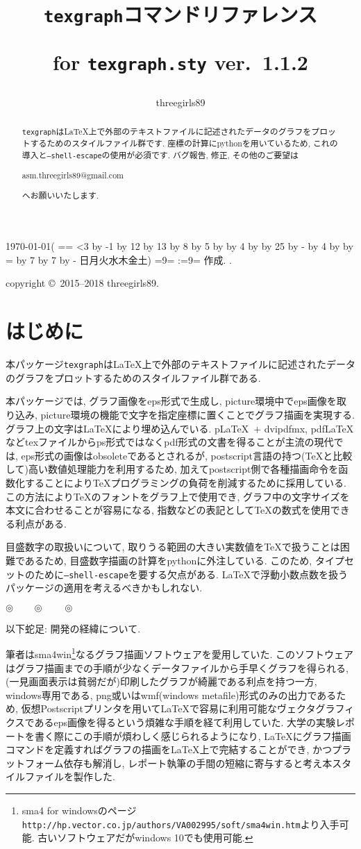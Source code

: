 \documentclass[10pt,a4j,twoside]{jsarticle}
\makeatletter
\def\Section#1{%
\clearpage
\section{#1}
\markboth{\thesection\hspace{1zw}#1}{\texttt{texgraph}コマンドリファレンス}%
}
\def\dayofweek{%
{\count0=\year \count1=\month
\ifnum \count1<3
 \advance \count0 by -1
 \advance \count1 by 12
\fi
\multiply \count1 by 13
\advance \count1 by 8
\divide \count1 by 5
\advance \count1 by \count0
\divide \count0 by 4
\advance \count1 by \count0
\divide \count0 by 25
\advance \count1 by -\count0
\divide \count0 by 4
\advance \count1 by \count0
\advance \count1 by \day
\count0=\count1
\divide \count1 by 7
\multiply \count1 by 7
\advance \count0 by -\count1
\ifcase \count0 日\or 月\or 火\or 水\or 木\or 金\or 土\fi}}
\def\ddigit#1{\setbox0=\hbox{9}\setbox1=\hbox{#1}%
  \ifdim \wd0<\wd1 #1\else 0#1\fi}
\newcounter{hour}
\newcounter{minuite}
\def\digitalhour{\ddigit{\thehour}}
\def\digitalminuite{\ddigit{\theminuite}}%
\renewcommand{\maketitle}{%
\begin{center}
{\gtfamily\bfseries\huge \@title}
\par
\bigskip
\ifx\@date\empty
\today (\dayofweek)
\digitalhour:\digitalminuite
\else
\@date
\fi
作成.
\hfil \@author.
\end{center}%
\global\let\@date\empty
\global\let\date\relax%
}
\def\date#1{\gdef\@date{#1}}
\def\circlesep{%
\begin{center}$\circledcirc\qquad\circledcirc\qquad\circledcirc$\end{center}%
}
\makeatother
\begin{document}
\thispagestyle{empty}
\title{\texttt{texgraph}コマンドリファレンス\\ \strut {\mdseries\large for \texttt{texgraph.sty} ver.\ 1.1.2}}
\author{threegirls89}
\maketitle
%
\begin{abstract}
\texttt{texgraph}は\LaTeX{}上で外部のテキストファイルに記述されたデータのグラフをプロットするためのスタイルファイル群です.
座標の計算にpythonを用いているため, これの導入と\texttt{--shell-escape}の使用が必須です.
バグ報告, 修正, その他のご要望は
\begin{center}
asm.threegirls89@gmail.com
\end{center}
へお願いいたします.%
\end{abstract}
%
\tableofcontents
%
\vfill
\begin{flushright}
copyright \copyright\ 2015--2018 threegirls89.
\end{flushright}

\Section{はじめに}
本パッケージ\texttt{texgraph}は\LaTeX{}上で外部のテキストファイルに記述されたデータのグラフをプロットするためのスタイルファイル群である.

本パッケージでは, グラフ画像をeps形式で生成し, picture環境中でeps画像を取り込み, picture環境の機能で文字を指定座標に置くことでグラフ描画を実現する.
グラフ上の文字は\LaTeX{}により埋め込んでいる.
p\LaTeX\ $+$ dvipdfmx, pdf\LaTeX{}などtexファイルからps形式ではなくpdf形式の文書を得ることが主流の現代では, eps形式の画像はobsoleteであるとされるが, postscript言語の持つ(\TeX{}と比較して)高い数値処理能力を利用するため, 加えてpostscript側で各種描画命令を函数化することにより\TeX{}プログラミングの負荷を削減するために採用している.
この方法により\TeX{}のフォントをグラフ上で使用でき, グラフ中の文字サイズを本文に合わせることが容易になる, 指数などの表記として\TeX{}の数式を使用できる利点がある.

目盛数字の取扱いについて, 取りうる範囲の大きい実数値を\TeX{}で扱うことは困難であるため, 目盛数字描画の計算をpythonに外注している.
このため, タイプセットのために\texttt{--shell-escape}を要する欠点がある.
\LaTeX{}で浮動小数点数を扱うパッケージの適用を考えるべきかもしれない.

\circlesep

以下蛇足: 開発の経緯について.

筆者はsma4win\footnote{sma4 for windowsのページ\texttt{http://hp.vector.co.jp/authors/VA002995/soft/sma4win.htm}より入手可能. 古いソフトウェアだがwindows 10でも使用可能.}なるグラフ描画ソフトウェアを愛用していた.
このソフトウェアはグラフ描画までの手順が少なくデータファイルから手早くグラフを得られる, (一見画面表示は貧弱だが)印刷したグラフが綺麗である利点を持つ一方, 
windows専用である, png或いはwmf(windows metafile)形式のみの出力であるため, 仮想Postscriptプリンタを用いて\LaTeX{}で容易に利用可能なヴェクタグラフィクスであるeps画像を得るという煩雑な手順を経て利用していた.
大学の実験レポートを書く際にこの手順が煩わしく感じられるようになり, \LaTeX{}にグラフ描画コマンドを定義すればグラフの描画を\LaTeX{}上で完結することができ, かつプラットフォーム依存も解消し, レポート執筆の手間の短縮に寄与すると考え本スタイルファイルを製作した.
\end{document}
